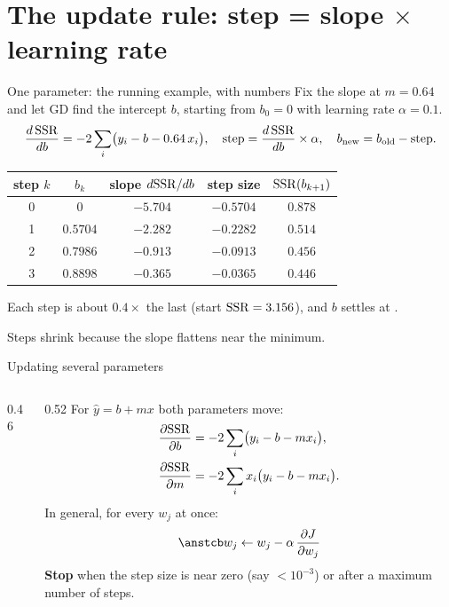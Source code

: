 \section{The update rule: step = slope $\times$ learning rate}

\begin{frame}{One parameter: the running example, with numbers}
  \small
  Fix the slope at $m = 0.64$ and let GD find the intercept $b$, starting from $b_0 = 0$ with learning rate $\alpha = 0.1$.
  \[
    \frac{d\,\mathrm{SSR}}{db} = -2\sum_{i}\bigl(y_i - b - 0.64\,x_i\bigr),\quad
    \text{step} = \frac{d\,\mathrm{SSR}}{db}\times\alpha,\quad b_{\text{new}} = b_{\text{old}} - \text{step}.
  \]
  \centering\footnotesize
  \begin{tabular}{@{}c c c c c@{}}
    \toprule
    step $k$ & $b_k$ & slope $d\mathrm{SSR}/db$ & step size & $\mathrm{SSR}(b_{k+1})$ \\
    \midrule
    0 & $0$ & $-5.704$ & $-0.5704$ & $0.878$ \\
    1 & $0.5704$ & $-2.282$ & $-0.2282$ & $0.514$ \\
    2 & $0.7986$ & $-0.913$ & $-0.0913$ & $0.456$ \\
    3 & $0.8898$ & $-0.365$ & $-0.0365$ & $0.446$ \\
    \bottomrule
  \end{tabular}

  \raggedright
  \vspace{4pt}
  Each step is about $0.4\times$ the last (start $\mathrm{SSR} = 3.156$), and $b$ settles at .\par
  Steps shrink because the slope flattens near the minimum.
\end{frame}

\begin{frame}{Updating several parameters}
  \begin{columns}[T]
    \begin{column}{0.46\textwidth}
      \centering
      \scalebox{0.9}{}
    \end{column}
    \begin{column}{0.52\textwidth}
      \small
      For $\hat y = b + mx$ both parameters move:
      \begin{align*}
        \frac{\partial\mathrm{SSR}}{\partial b} &= -2\sum_i\bigl(y_i - b - m x_i\bigr),\\
        \frac{\partial\mathrm{SSR}}{\partial m} &= -2\sum_i x_i\bigl(y_i - b - m x_i\bigr).
      \end{align*}
      In general, for every $w_j$ at once:
      \[
        \ans{w_j \leftarrow w_j - \alpha\,\frac{\partial J}{\partial w_j}}
      \]
      \textbf{Stop} when the step size is near zero (say $<10^{-3}$) or after a maximum number of steps.
    \end{column}
  \end{columns}
\end{frame}

